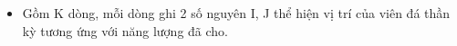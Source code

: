 \begin{itemize}
	\item     Gồm K dòng, mỗi dòng ghi 2 số nguyên I, J thể hiện vị trí của viên đá thần kỳ tương ứng với năng lượng đã cho.   
\end{itemize}